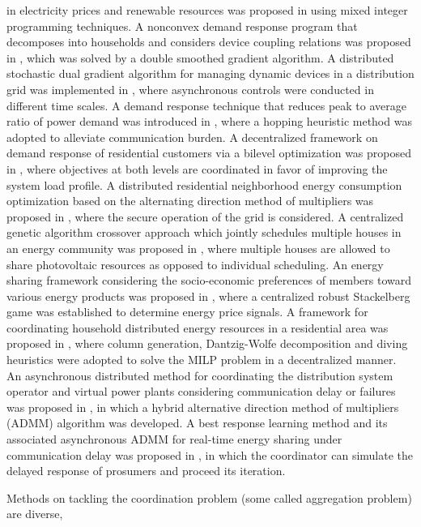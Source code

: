 \documentclass[journal]{IEEEtran}
\begin{document}
in electricity prices and renewable resources was proposed in \cite{kim2013}
using mixed integer programming techniques.
A nonconvex demand response program that decomposes into households
and considers device coupling relations was proposed in \cite{fast2016},
which was solved by a double smoothed gradient algorithm.
A distributed stochastic dual gradient algorithm for managing dynamic devices in
a distribution grid was implemented in \cite{async2020}, where asynchronous
controls were conducted in different time scales.
A demand response technique that reduces peak to average ratio of power demand
was introduced in \cite{heuristic2019}, where a hopping heuristic method was
adopted to alleviate communication burden.
A decentralized framework on demand response of residential customers
via a bilevel optimization was proposed in \cite{orlm2016}, where objectives at
both levels are coordinated in favor of improving the system load profile.
A distributed residential neighborhood energy consumption optimization
based on the alternating direction method of multipliers was proposed in
\cite{neighborhood2021}, where the secure operation of the grid is considered.
A centralized genetic algorithm crossover approach which jointly schedules
multiple houses in an energy community was proposed in \cite{community2024},
where multiple houses are allowed to share photovoltaic resources
as opposed to individual scheduling.
An energy sharing framework considering the socio-economic preferences
of members toward various energy products was proposed in \cite{preference2024},
where a centralized robust Stackelberg game was established to determine energy
price signals.
A framework for coordinating household distributed energy resources
in a residential area was proposed in \cite{dw2019}, where column generation,
Dantzig-Wolfe decomposition and diving heuristics were adopted to solve
the MILP problem in a decentralized manner.
An asynchronous distributed method for coordinating the distribution system operator and
virtual power plants considering communication delay or failures was proposed in \cite{wang2023},
in which a hybrid alternative direction method of multipliers (ADMM) algorithm was developed.
A best response learning method and its associated asynchronous ADMM for real-time
energy sharing under communication delay was proposed in \cite{wu2025}, in which
the coordinator can simulate the delayed response of prosumers and proceed its iteration.
\par
Methods on tackling the coordination problem (some called aggregation problem) are diverse,
\end{document}
